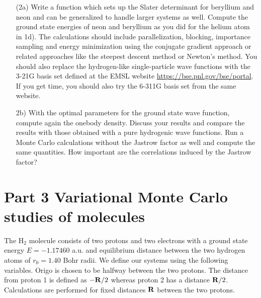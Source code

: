 \documentclass[10pt]{article}
\begin{document}
\begin{enumerate}
\item[(2a)]   Write a function which sets up the Slater determinant for beryllium and neon and can be generalized to
handle larger systems as well. 
Compute the ground state energies of neon and beryllium as you did for the helium atom
in 1d). 
The calculations should include  parallelization, blocking, importance sampling and energy minimization using the conjugate gradient approach or related approaches like the steepest descent method or Newton's method.  You should also replace the hydrogen-like single-particle wave functions with the 3-21G basis set defined 
at the EMSL website \url{https://bse.pnl.gov/bse/portal}. If you get time, you should also try the 6-311G basis set from the same website.

\item[2b)]  With the optimal parameters for the ground state wave function, compute again the onebody density. Discuss your results and compare the results with those obtained with a pure hydrogenic wave functions. Run a Monte Carlo calculations without the Jastrow factor as well
and compute the same quantities. How important are the correlations induced by the Jastrow factor?


\end{enumerate}


\section*{Part 3 Variational Monte Carlo studies of molecules}

The 
H$_2$ molecule consists of two protons and two electrons 
with a ground state energy $E=-1.17460$ a.u. and equilibrium distance between the two hydrogen atoms
of $r_0=1.40$ Bohr radii.
We define our systems using the following variables.
Origo is chosen to be halfway between the two protons. The distance from 
proton 1 is defined as 
$-{\bf R}/2$ whereas proton 2 has a distance ${\bf R}/2$.
Calculations are performed for fixed distances ${\bf R}$ between the two protons.
\end{document}

